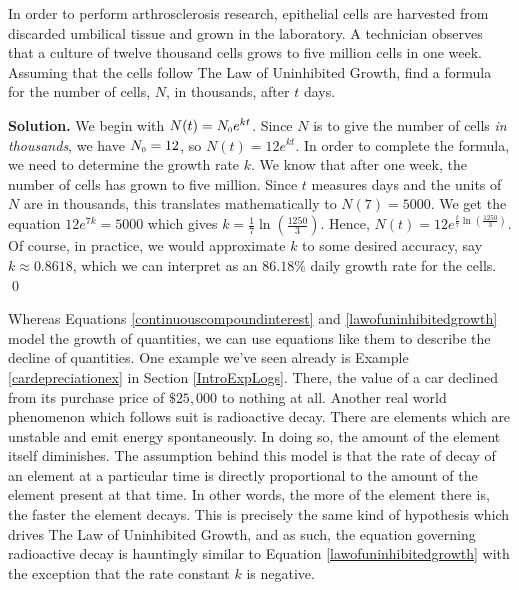 \smallskip

\begin{ex}  In order to perform arthrosclerosis research, epithelial cells are harvested from discarded umbilical tissue and grown in the laboratory.  A technician observes that a culture of twelve thousand cells grows to five million cells in one week.  Assuming that the cells follow The Law of Uninhibited Growth, find a formula for the number of cells, $N$, in thousands, after $t$ days.

\smallskip

{\bf Solution.}  We begin with $N(t) = N_{\mbox{\tiny$0$}}e^{kt}$.  Since $N$ is to give the number of cells \textit{in thousands}, we have $N_{\mbox{\tiny$0$}} = 12$, so $N(t) = 12e^{kt}$.  In order to complete the formula, we need to determine the growth rate $k$.  We know that after one week, the number of cells has grown to five million.  Since $t$ measures days and the units of $N$ are in thousands, this translates mathematically to $N(7) = 5000$.  We get the equation $12e^{7k} = 5000$ which gives $k = \frac{1}{7} \ln\left(\frac{1250}{3}\right)$.  Hence,  $N(t) = 12e^{ \frac{t}{7} \ln\left(\frac{1250}{3}\right)}$.  Of course, in practice, we would approximate $k$ to some desired accuracy, say $k \approx 0.8618$, which we can interpret as an $86.18 \%$ daily growth rate for the cells. \qed

\end{ex}

Whereas Equations \ref{continuouscompoundinterest} and \ref{lawofuninhibitedgrowth} model the growth of quantities, we can use equations like them to describe the decline of quantities.  One example we've seen already is Example \ref{cardepreciationex} in Section \ref{IntroExpLogs}.  There, the value of a car declined from its purchase price of $\$25,\!000$ to nothing at all.  Another real world phenomenon which follows suit is radioactive decay.  There are elements which are unstable and emit energy spontaneously.  In doing so, the amount of the element itself diminishes.  The assumption behind this model is that the rate of decay of an element at a particular time is directly proportional to the amount of the element present at that time.  In other words, the more of the element there is, the faster the element decays.  This is precisely the same kind of hypothesis which drives The Law of Uninhibited Growth, and as such, the equation governing radioactive decay is hauntingly similar to Equation \ref{lawofuninhibitedgrowth} with the exception that the rate constant $k$ is negative.

